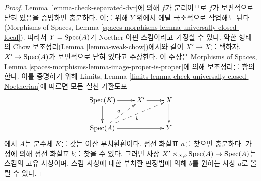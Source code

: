 \begin{proof}
Lemma \ref{lemma-check-separated-dvr}에 의해 $f$가 분리이므로
$f$가 보편적으로 닫혀 있음을 증명하면 충분하다. 이를 위해 $Y$ 위에서
에탈 국소적으로 작업해도 된다(Morphisms of Spaces, Lemma
\ref{spaces-morphisms-lemma-universally-closed-local}). 따라서
$Y = \mathop{\mathrm{Spec}}(A)$가 Noether 아핀 스킴이라고 가정할 수 있다. 약한 형태의
Chow 보조정리(Lemma \ref{lemma-weak-chow})에서와 같이
$X' \to X$를 택하자. $X' \to \mathop{\mathrm{Spec}}(A)$가 보편적으로 닫혀 있다고
주장한다. 이 주장은 Morphisms of Spaces, Lemma
\ref{spaces-morphisms-lemma-image-proper-is-proper}에 의해 보조정리를
함의한다. 이를 증명하기 위해 Limits, Lemma
\ref{limits-lemma-check-universally-closed-Noetherian}에 따르면 모든
실선 가환도표
$$
\xymatrix{
\Spec(K) \ar[r] \ar[d] & X' \ar[r] & X \ar[d] \\
\Spec(A) \ar[rr] \ar@{-->}[ru]^a \ar@{-->}[rru]_b & & Y
}
$$
에서 $A$는 분수체 $K$를 갖는 이산 부치환환이다. 점선 화살표 $a$를
찾으면 충분하다. 가정에 의해 점선 화살표 $b$를 찾을 수 있다.
그러면 사상
$X' \times_{X, b} \mathop{\mathrm{Spec}}(A) \to \mathop{\mathrm{Spec}}(A)$는 스킴의 고유 사상이며,
스킴 사상에 대한 부치환 판정법에 의해 $b$를 원하는 사상 $a$로
올릴 수 있다.
\end{proof}


